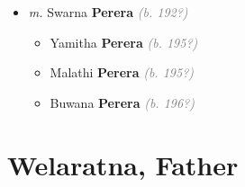 \documentclass[10pt, openany]{book}
\begin{document}
\begin{itemize}
{\begin{itemize}
{\begin{itemize}
\item{\textit{m.} Swarna \textbf{Perera} \textcolor{gray}{\textit{(b. 192?)}}   \label{couple:00000612:00000614} \begin{itemize}
\item{Yamitha \textbf{Perera} \textcolor{gray}{\textit{(b. 195?)}}
 }
\item{Malathi \textbf{Perera} \textcolor{gray}{\textit{(b. 195?)}}
 }
\item{Buwana \textbf{Perera} \textcolor{gray}{\textit{(b. 196?)}}
 }
\end{itemize}}
\end{itemize}
  }
\end{itemize}}
\end{itemize}
  
\part{Welaratna, Father}
\end{document}
